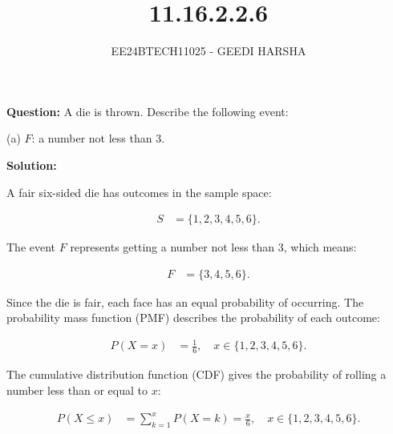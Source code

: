 \documentclass[journal]{IEEEtran}
\begin{document}

\vspace{3cm}
\title{11.16.2.2.6}
\author{EE24BTECH11025 - GEEDI HARSHA}
{\let\newpage\relax\maketitle}

\renewcommand{\thefigure}{\theenumi}
\renewcommand{\thetable}{\theenumi}
\setlength{\intextsep}{10pt} %


\renewcommand{\thetable}{\theenumi}







\textbf{Question:} A die is thrown. Describe the following event:  

(a) \( F \): a number not less than 3.

\textbf{Solution:}

A fair six-sided die has outcomes in the sample space:

\begin{align}
    S &= \{1, 2, 3, 4, 5, 6\}.
\end{align}

The event \( F \) represents getting a number not less than 3, which means:

\begin{align}
    F &= \{3, 4, 5, 6\}.
\end{align}

Since the die is fair, each face has an equal probability of occurring. The probability mass function (PMF) describes the probability of each outcome:

\begin{align}
    P(X = x) &= \frac{1}{6}, \quad x \in \{1, 2, 3, 4, 5, 6\}.
\end{align}

The cumulative distribution function (CDF) gives the probability of rolling a number less than or equal to \( x \):

\begin{align}
    P(X \leq x) &= \sum_{k=1}^{x} P(X = k) = \frac{x}{6}, \quad x \in \{1, 2, 3, 4, 5, 6\}.
\end{align}
\end{document}
